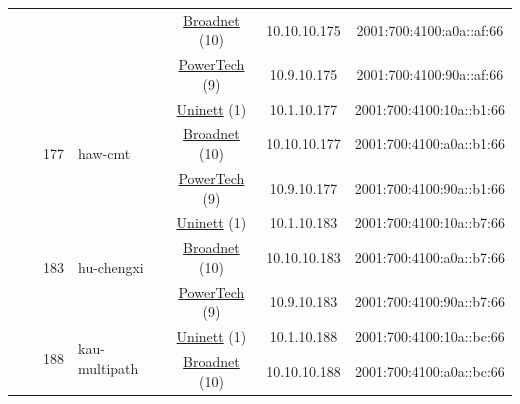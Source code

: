 \begin{small}
\begin{center}
\begin{longtable}{|c|c|c|c|c|c|c|c|}
  &  &  &  & \multicolumn{2}{|c|}{\tiny{\href{https://www.broadnet.no}{Broadnet} (10)}} & \tiny{10.10.10.175} & \tiny{2001:700:4100:a0a::af:66} \\* \cline{5-5}\cline{6-6}\cline{7-7}\cline{8-8}
  &  &  &  & \multicolumn{2}{|c|}{\tiny{\href{http://www.powertech.no}{PowerTech} (9)}} & \tiny{10.9.10.175} & \tiny{2001:700:4100:90a::af:66} \\* \cline{3-3}\cline{4-4}\cline{5-5}\cline{6-6}\cline{7-7}\cline{8-8}
  &  & \multirow{3}{*}{\tiny{177}} & \multicolumn{1}{|l|}{\multirow{3}{*}{\tiny{haw-cmt}}} & \multicolumn{2}{|c|}{\tiny{\href{https://www.uninett.no}{Uninett} (1)}} & \tiny{10.1.10.177} & \tiny{2001:700:4100:10a::b1:66} \\* \cline{5-5}\cline{6-6}\cline{7-7}\cline{8-8}
  &  &  &  & \multicolumn{2}{|c|}{\tiny{\href{https://www.broadnet.no}{Broadnet} (10)}} & \tiny{10.10.10.177} & \tiny{2001:700:4100:a0a::b1:66} \\* \cline{5-5}\cline{6-6}\cline{7-7}\cline{8-8}
  &  &  &  & \multicolumn{2}{|c|}{\tiny{\href{http://www.powertech.no}{PowerTech} (9)}} & \tiny{10.9.10.177} & \tiny{2001:700:4100:90a::b1:66} \\* \cline{3-3}\cline{4-4}\cline{5-5}\cline{6-6}\cline{7-7}\cline{8-8}
  &  & \multirow{3}{*}{\tiny{183}} & \multicolumn{1}{|l|}{\multirow{3}{*}{\tiny{hu-chengxi}}} & \multicolumn{2}{|c|}{\tiny{\href{https://www.uninett.no}{Uninett} (1)}} & \tiny{10.1.10.183} & \tiny{2001:700:4100:10a::b7:66} \\* \cline{5-5}\cline{6-6}\cline{7-7}\cline{8-8}
  &  &  &  & \multicolumn{2}{|c|}{\tiny{\href{https://www.broadnet.no}{Broadnet} (10)}} & \tiny{10.10.10.183} & \tiny{2001:700:4100:a0a::b7:66} \\* \cline{5-5}\cline{6-6}\cline{7-7}\cline{8-8}
  &  &  &  & \multicolumn{2}{|c|}{\tiny{\href{http://www.powertech.no}{PowerTech} (9)}} & \tiny{10.9.10.183} & \tiny{2001:700:4100:90a::b7:66} \\* \cline{3-3}\cline{4-4}\cline{5-5}\cline{6-6}\cline{7-7}\cline{8-8}
  &  & \multirow{3}{*}{\tiny{188}} & \multicolumn{1}{|l|}{\multirow{3}{*}{\tiny{kau-multipath}}} & \multicolumn{2}{|c|}{\tiny{\href{https://www.uninett.no}{Uninett} (1)}} & \tiny{10.1.10.188} & \tiny{2001:700:4100:10a::bc:66} \\* \cline{5-5}\cline{6-6}\cline{7-7}\cline{8-8}
  &  &  &  & \multicolumn{2}{|c|}{\tiny{\href{https://www.broadnet.no}{Broadnet} (10)}} & \tiny{10.10.10.188} & \tiny{2001:700:4100:a0a::bc:66} \\* \cline{5-5}\cline{6-6}\cline{7-7}\cline{8-8}

\end{longtable}
\end{center}
\end{small}
